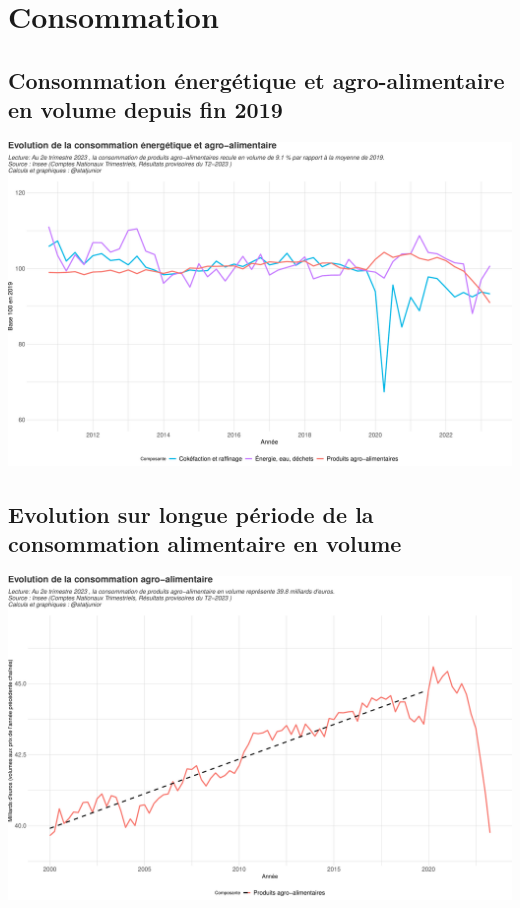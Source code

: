 \documentclass[
  paper=a4,
  ,captions=tableheading
]{scrartcl}
\begin{document}
\newpage

\hypertarget{consommation}{%
\section{Consommation}\label{consommation}}

\hypertarget{consommation-uxe9nerguxe9tique-et-agro-alimentaire-en-volume-depuis-fin-2019}{%
\subsection{Consommation énergétique et agro-alimentaire en volume
depuis fin
2019}\label{consommation-uxe9nerguxe9tique-et-agro-alimentaire-en-volume-depuis-fin-2019}}

\includegraphics{rapport_pdf_compte_branche_files/figure-latex/unnamed-chunk-8-1.pdf}

\hypertarget{evolution-sur-longue-puxe9riode-de-la-consommation-alimentaire-en-volume}{%
\subsection{Evolution sur longue période de la consommation alimentaire
en
volume}\label{evolution-sur-longue-puxe9riode-de-la-consommation-alimentaire-en-volume}}

\includegraphics{rapport_pdf_compte_branche_files/figure-latex/unnamed-chunk-9-1.pdf}
\end{document}
